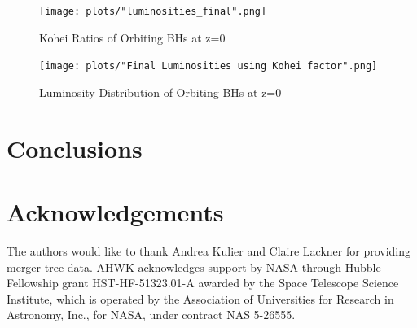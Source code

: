 \documentclass[english, apj]{emulateapj}
\begin{document}

\begin{figure}[ht]
\begin{center}
\texttt{[image: plots/"luminosities\_final".png]}
\caption{Kohei Ratios of Orbiting BHs at z=0}
\label{fig:loobhs}
\end{center}
\end{figure}

\begin{figure}[ht]
\begin{center}
\texttt{[image: plots/"Final Luminosities using Kohei factor".png]}
\caption{Luminosity Distribution of Orbiting BHs at z=0}
\label{fig:ldobhs}
\end{center}
\end{figure}

\section{Conclusions}\label{sec:conclusions}

\section{Acknowledgements}
The authors would like to thank Andrea Kulier and Claire Lackner for providing merger tree data. AHWK acknowledges support by NASA through Hubble Fellowship grant HST-HF-51323.01-A awarded by the Space Telescope Science Institute, which is operated by the Association of Universities for Research in Astronomy, Inc., for NASA, under contract NAS 5-26555.








\end{document}
